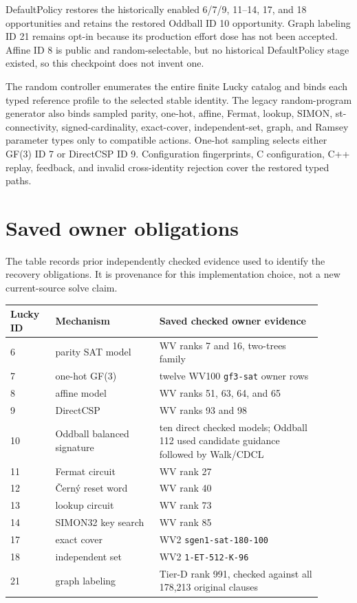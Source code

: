 \documentclass[11pt]{article}
\begin{document}
DefaultPolicy restores the historically enabled 6/7/9, 11--14, 17, and 18
opportunities and retains the restored Oddball ID 10 opportunity.  Graph
labeling ID 21 remains opt-in because its production effort dose has not been
accepted.  Affine ID 8 is public and random-selectable, but no historical
DefaultPolicy stage existed, so this checkpoint does not invent one.

The random controller enumerates the entire finite Lucky catalog and binds
each typed reference profile to the selected stable identity.  The legacy
random-program generator also binds sampled parity, one-hot, affine, Fermat,
lookup, SIMON, st-connectivity, signed-cardinality, exact-cover,
independent-set, graph, and Ramsey parameter types only to compatible actions.
One-hot sampling selects either GF(3) ID 7 or DirectCSP ID 9.  Configuration
fingerprints, C configuration, C++ replay, feedback, and invalid cross-identity
rejection cover the restored typed paths.

\section*{Saved owner obligations}

The table records prior independently checked evidence used to identify the
recovery obligations.  It is provenance for this implementation choice, not a
new current-source solve claim.

\begin{center}
\begin{tabular}{@{}p{0.13\linewidth}p{0.30\linewidth}p{0.47\linewidth}@{}}
\toprule
Lucky ID & Mechanism & Saved checked owner evidence \\
\midrule
6 & parity SAT model & WV ranks 7 and 16, two-trees family \\
7 & one-hot GF(3) & twelve WV100 \texttt{gf3-sat} owner rows \\
8 & affine model & WV ranks 51, 63, 64, and 65 \\
9 & DirectCSP & WV ranks 93 and 98 \\
10 & Oddball balanced signature & ten direct checked models; Oddball 112 used candidate guidance followed by Walk/CDCL \\
11 & Fermat circuit & WV rank 27 \\
12 & \v{C}ern\'y reset word & WV rank 40 \\
13 & lookup circuit & WV rank 73 \\
14 & SIMON32 key search & WV rank 85 \\
17 & exact cover & WV2 \texttt{sgen1-sat-180-100} \\
18 & independent set & WV2 \texttt{1-ET-512-K-96} \\
21 & graph labeling & Tier-D rank 991, checked against all 178,213 original clauses \\
\bottomrule
\end{tabular}
\end{center}
\end{document}
